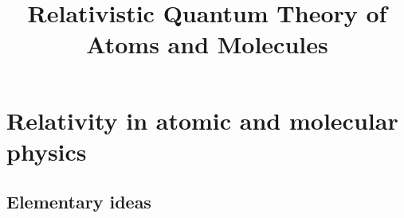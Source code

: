 \documentclass[a4paper,lang=cn,a4paper]{elegantpaper}
\title{Relativistic Quantum Theory of Atoms and Molecules}
\date{}
\begin{document}
\maketitle
\section{Relativity in atomic and molecular physics}

\subsection{Elementary ideas}
\end{document}
